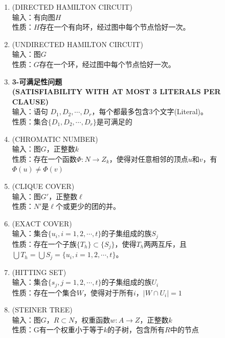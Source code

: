 \documentclass[twocolumn]{article}
\theoremstyle{nonumberplain}%
\begin{document}
\begin{CJK}{UTF8}{gbsn}
\begin{enumerate}
    \item {(DIRECTED HAMILTON CIRCUIT)}\\
    输入：有向图$H$\\
    性质：$H$存在一个有向环，经过图中每个节点恰好一次。

    \item {(UNDIRECTED HAMILTON CIRCUIT)}\\
    输入：图$G$\\
    性质：$G$存在一个环，经过图中每个节点恰好一次。

    \item {\bf3-可满足性问题\\(SATISFIABILITY WITH AT MOST 3 LITERALS PER CLAUSE)}\\
    输入：语句 $D_1,D_2,\cdots,D_r$，每个都最多包含3个文字(Literal)。\\
    性质：集合$\{D_1,D_2,\cdots,D_r\}$是可满足的

    \item {(CHROMATIC NUMBER)}\\
    输入：图$G$，正整数$k$\\
    性质：存在一个函数$\Phi:N\rightarrow Z_k$，使得对任意相邻的顶点$u$和$v$，有$\Phi(u)\neq\Phi(v)$

    \item {(CLIQUE COVER)}\\
    输入：图$G'$，正整数$\ell$\\
    性质：$N'$是$\ell$个或更少的团的并。

    \item {(EXACT COVER)}\\
    输入：集合$\{u_i,i=1,2,\cdots,t\}$的子集组成的族${S_j}$\\
    性质：存在一个子族$\{T_h\}\subset\{S_j\}$，使得$T_h$两两互斥，且$\bigcup T_h=\bigcup S_j=\{u_i,i=1,2,\cdots,t\}$。

    \item {(HITTING SET)}\\
    输入：集合$\{s_j,j=1,2,\cdots,t\}$的子集组成的族${U_i}$\\
    性质：存在一个集合$W$，使得对于所有$i$，$|W\cap U_i|=1$

    \item {(STEINER TREE)}\\
    输入：图$G$，$R\subset N$，权重函数$w:A\rightarrow Z$，正整数$k$\\
    性质：G有一个权重小于等于$k$的子树，包含所有$R$中的节点


\end{enumerate}
\end{CJK}
\end{document}
